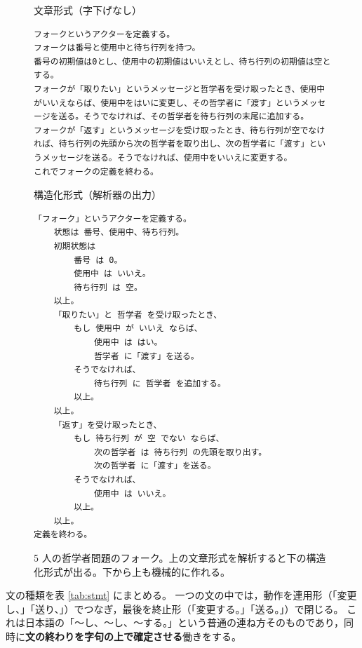 \documentclass[a4paper,10pt]{ltjsarticle}
\begin{document}
\begin{figure}[t]
\begin{prog}{文章形式（字下げなし）}
\begin{Verbatim}
フォークというアクターを定義する。
フォークは番号と使用中と待ち行列を持つ。
番号の初期値は0とし、使用中の初期値はいいえとし、待ち行列の初期値は空とする。
フォークが「取りたい」というメッセージと哲学者を受け取ったとき、使用中がいいえならば、使用中をはいに変更し、その哲学者に「渡す」というメッセージを送る。そうでなければ、その哲学者を待ち行列の末尾に追加する。
フォークが「返す」というメッセージを受け取ったとき、待ち行列が空でなければ、待ち行列の先頭から次の哲学者を取り出し、次の哲学者に「渡す」というメッセージを送る。そうでなければ、使用中をいいえに変更する。
これでフォークの定義を終わる。
\end{Verbatim}
\end{prog}
\vspace{-2pt}
\begin{prog}{構造化形式（解析器の出力）}
\begin{Verbatim}[fontsize=\footnotesize]
「フォーク」というアクターを定義する。
    状態は 番号、使用中、待ち行列。
    初期状態は
        番号 は 0。
        使用中 は いいえ。
        待ち行列 は 空。
    以上。
    「取りたい」と 哲学者 を受け取ったとき、
        もし 使用中 が いいえ ならば、
            使用中 は はい。
            哲学者 に「渡す」を送る。
        そうでなければ、
            待ち行列 に 哲学者 を追加する。
        以上。
    以上。
    「返す」を受け取ったとき、
        もし 待ち行列 が 空 でない ならば、
            次の哲学者 は 待ち行列 の先頭を取り出す。
            次の哲学者 に「渡す」を送る。
        そうでなければ、
            使用中 は いいえ。
        以上。
    以上。
定義を終わる。
\end{Verbatim}
\end{prog}
\caption{5 人の哲学者問題のフォーク。上の文章形式を解析すると下の構造化形式が出る。下から上も機械的に作れる。}\label{fig:phil}
\end{figure}

文の種類を表 \ref{tab:stmt} にまとめる。
一つの文の中では，動作を連用形（「変更し、」「送り、」）でつなぎ，最後を終止形（「変更する。」「送る。」）で閉じる。
これは日本語の「〜し、〜し、〜する。」という普通の連ね方そのものであり，同時に\textbf{文の終わりを字句の上で確定させる}働きをする。
\end{document}
